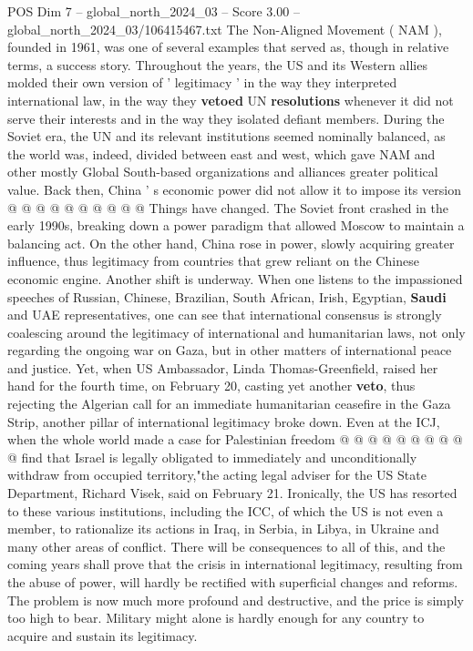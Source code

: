 \begin{textsample}{POS Dim 7 – global\_north\_2024\_03 – Score 3.00 – global\_north\_2024\_03/106415467.txt}
The Non-Aligned Movement ( NAM ), founded in 1961, was one of several examples that served as, though in relative terms, a success story.
Throughout the years, the US and its Western allies molded their own version of ' legitimacy ' in the way they interpreted international law, in the way they \textbf{vetoed} UN \textbf{resolutions} whenever it did not serve their interests and in the way they isolated defiant members.
During the Soviet era, the UN and its relevant institutions seemed nominally balanced, as the world was, indeed, divided between east and west, which gave NAM and other mostly Global South-based organizations and alliances greater political value.
Back then, China ' s economic power did not allow it to impose its version @ @ @ @ @ @ @ @ @ @ Things have changed.
The Soviet front crashed in the early 1990s, breaking down a power paradigm that allowed Moscow to maintain a balancing act.
On the other hand, China rose in power, slowly acquiring greater influence, thus legitimacy from countries that grew reliant on the Chinese economic engine.
Another shift is underway.
When one listens to the impassioned speeches of Russian, Chinese, Brazilian, South African, Irish, Egyptian, \textbf{Saudi} and UAE representatives, one can see that international consensus is strongly coalescing around the legitimacy of international and humanitarian laws, not only regarding the ongoing war on Gaza, but in other matters of international peace and justice.
Yet, when US Ambassador, Linda Thomas-Greenfield, raised her hand for the fourth time, on February 20, casting yet another \textbf{veto}, thus rejecting the Algerian call for an immediate humanitarian ceasefire in the Gaza Strip, another pillar of international legitimacy broke down.
Even at the ICJ, when the whole world made a case for Palestinian freedom @ @ @ @ @ @ @ @ @ @ find that Israel is legally obligated to immediately and unconditionally withdraw from occupied territory,"the acting legal adviser for the US State Department, Richard Visek, said on February 21.
Ironically, the US has resorted to these various institutions, including the ICC, of which the US is not even a member, to rationalize its actions in Iraq, in Serbia, in Libya, in Ukraine and many other areas of conflict.
There will be consequences to all of this, and the coming years shall prove that the crisis in international legitimacy, resulting from the abuse of power, will hardly be rectified with superficial changes and reforms.
The problem is now much more profound and destructive, and the price is simply too high to bear.
Military might alone is hardly enough for any country to acquire and sustain its legitimacy.

\end{textsample}

